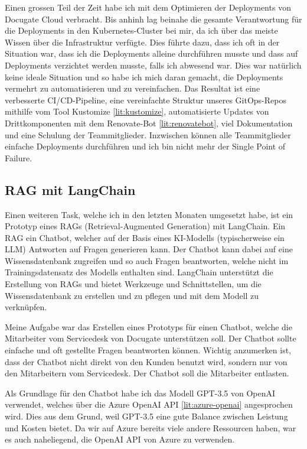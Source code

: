 \documentclass{bpraxis}
\begin{document}
Einen grossen Teil der Zeit habe ich mit dem Optimieren der Deployments von Docugate Cloud verbracht. Bis anhinh lag beinahe die gesamte Verantwortung für die Deployments in den Kubernetes-Cluster bei mir,
da ich über das meiste Wissen über die Infrastruktur verfügte. Dies führte dazu, dass ich oft in der Situation war, dass ich die Deployments alleine durchführen musste und dass auf Deployments verzichtet werden musste,
falls ich abwesend war. Dies war natürlich keine ideale Situation und so habe ich mich daran gemacht, die Deployments vermehrt zu automatisieren und zu vereinfachen.
Das Resultat ist eine verbesserte CI/CD-Pipeline, eine vereinfachte Struktur unseres GitOps-Repos mithilfe vom Tool Kustomize \ref{lit:kustomize}, automatisierte Updates von Drittkomponenten mit dem Renovate-Bot \ref{lit:renovatebot},
viel Dokumentation und eine Schulung der Teammitglieder. Inzwischen können alle Teammitglieder einfache Deployments durchführen und ich bin nicht mehr der Single Point of Failure.

\subsection{RAG mit LangChain}

Einen weiteren Task, welche ich in den letzten Monaten umgesetzt habe, ist ein Prototyp eines RAGs (Retrieval-Augmented Generation) mit LangChain. Ein RAG ein Chatbot, welcher auf der Basis eines KI-Modells (typischerweise ein LLM)
Antworten auf Fragen generieren kann. Der Chatbot kann dabei auf eine Wissensdatenbank zugreifen und so auch Fragen beantworten, welche nicht im Trainingsdatensatz des Modells enthalten sind.
LangChain unterstützt die Erstellung von RAGs und bietet Werkzeuge und Schnittstellen, um die Wissensdatenbank zu erstellen und zu pflegen und mit dem Modell zu verknüpfen.

Meine Aufgabe war das Erstellen eines Prototyps für einen Chatbot, welche die Mitarbeiter vom Servicedesk von Docugate unterstützen soll. Der Chatbot sollte einfache und oft gestellte Fragen beantworten können.
Wichtig anzumerken ist, dass der Chatbot nicht direkt von den Kunden benutzt wird, sondern nur von den Mitarbeitern vom Servicedesk. Der Chatbot soll die Mitarbeiter entlasten.

Als Grundlage für den Chatbot habe ich das Modell GPT-3.5 von OpenAI verwendet, welches über die Azure OpenAI API \ref{lit:azure-openai} angesprochen wird. Dies aus dem Grund, weil GPT-3.5 eine gute Balance zwischen
Leistung und Kosten bietet. Da wir auf Azure bereits viele andere Ressourcen haben, war es auch naheliegend, die OpenAI API von Azure zu verwenden.
\end{document}
